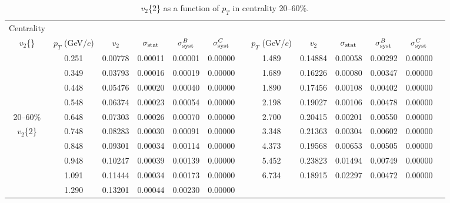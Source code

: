 \documentclass[aps,prc,superscriptaddress,showpacs,floatfix,twocolumn]{revtex4}
\newcommand \gevc{GeV/$c$\xspace}
\newcommand \pt{\mbox{$p_T$}\xspace}
\begin{document}
\begin{table}[htbp]
\caption{\label{tab:table_v2cumulant_cent20-60}
 $v_2$\{2\} as a function of \pt in centrality 20--60\%.
}
\begingroup \squeezetable
\begin{ruledtabular} \begin{tabular}{c|cccccc|cccccc}
Centrality & & & & & & & & & & & \\
$v_2$\{\} & $\pt$ (\gevc) & $v_2$ & $\sigma_{\rm stat}$ & $\sigma_{\rm syst}^B$ & $\sigma_{\rm syst}^C$ 
 & & $\pt$ (\gevc) & $v_2$ & $\sigma_{\rm stat}$ & $\sigma_{\rm syst}^B$ & $\sigma_{\rm syst}^C$ \\ 
\hline
 & 0.251 & 0.00778   &  0.00011  & 0.00001 & 0.00000 && 1.489 & 0.14884   &  0.00058  & 0.00292 & 0.00000 \\ 
 & 0.349 & 0.03793   &  0.00016  & 0.00019 & 0.00000 && 1.689 & 0.16226   &  0.00080  & 0.00347 & 0.00000 \\
 & 0.448 & 0.05476   &  0.00020  & 0.00040 & 0.00000 && 1.890 & 0.17456   &  0.00108  & 0.00402 & 0.00000 \\
 & 0.548 & 0.06374   &  0.00023  & 0.00054 & 0.00000 && 2.198 & 0.19027   &  0.00106  & 0.00478 & 0.00000 \\
20--60\%
 & 0.648 & 0.07303   &  0.00026  & 0.00070 & 0.00000 && 2.700 & 0.20415   &  0.00201  & 0.00550 & 0.00000 \\
$v_2$\{2\}
 & 0.748 & 0.08283   &  0.00030  & 0.00091 & 0.00000 && 3.348 & 0.21363   &  0.00304  & 0.00602 & 0.00000 \\
 & 0.848 & 0.09301   &  0.00034  & 0.00114 & 0.00000 && 4.373 & 0.19568   &  0.00653  & 0.00505 & 0.00000 \\
 & 0.948 & 0.10247   &  0.00039  & 0.00139 & 0.00000 && 5.452 & 0.23823   &  0.01494  & 0.00749 & 0.00000 \\
 & 1.091 & 0.11444   &  0.00034  & 0.00173 & 0.00000 && 6.734 & 0.18915   &  0.02297  & 0.00472 & 0.00000 \\
 & 1.290 & 0.13201   &  0.00044  & 0.00230 & 0.00000 && &  &  &  &
\end{tabular} \end{ruledtabular} \endgroup
\end{table}
\end{document}
